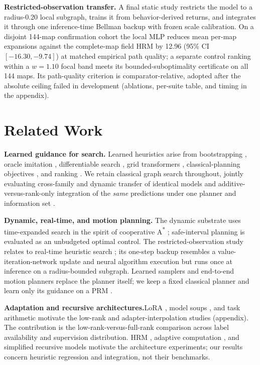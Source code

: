 \documentclass[letterpaper]{article} %
\begin{document}
\textbf{Restricted-observation transfer.} A final static study restricts the model to a radius-0.20 local subgraph, trains it from behavior-derived returns, and integrates it through one inference-time Bellman backup with frozen scale calibration. On a disjoint 144-map confirmation cohort the local MLP reduces mean per-map expansions against the complete-map field HRM by 12.96 (95\% CI $[-16.30,-9.74]$) at matched empirical path quality; a separate control ranking within a $w{=}1.10$ focal band meets its bounded-suboptimality certificate on all 144 maps. Its path-quality criterion is comparator-relative, adopted after the absolute ceiling failed in development (ablations, per-suite table, and timing in the appendix).
\section{Related Work}

\textbf{Learned guidance for search.} Learned heuristics arise from bootstrapping \citep{arfaee2011bootstrap}, oracle imitation \citep{bhardwaj2017sail}, differentiable search \citep{yonetani2021neuralastar}, grid transformers \citep{kirilenko2023transpath}, classical-planning objectives \citep{ferber2020neural}, and ranking \citep{chrestien2023rank}. We retain classical graph search throughout, jointly evaluating cross-family and dynamic transfer of identical models and additive-versus-rank-only integration of the \emph{same} predictions under one planner and information set \citep{pohl1970,pearl1982semiadmissible,aine2016mha}.

\textbf{Dynamic, real-time, and motion planning.} The dynamic substrate uses time-expanded search in the spirit of cooperative A\textsuperscript{*} \citep{silver2005cooperative}; safe-interval planning \citep{phillips2011sipp} is evaluated as an unbudgeted optimal control. The restricted-observation study relates to real-time heuristic search \citep{korf1990rta,koenig2006rtaa}; its one-step backup resembles a value-iteration-network update \citep{tamar2016vin,lee2018gppn} and neural algorithm execution \citep{velickovic2021nar} but runs once at inference on a radius-bounded subgraph. Learned samplers and end-to-end motion planners \citep{ichter2018sampling,qureshi2019mpnet} replace the planner itself; we keep a fixed classical planner and learn only its guidance on a PRM \citep{kavraki1996prm}.

\textbf{Adaptation and recursive architectures.}\hspace{0.25em}LoRA \citep{hu2021lora}, model soups \citep{wortsman2022soups}, and task arithmetic \citep{ilharco2022task} motivate the low-rank and adapter-interpolation studies (appendix). The contribution is the low-rank-versus-full-rank comparison across label availability and supervision distribution. HRM \citep{wang2025hrm}, adaptive computation \citep{graves2016act,banino2021pondernet}, and simplified recursive models \citep{jolicoeur2025trm} motivate the architecture experiments; our results concern heuristic regression and integration, not their benchmarks.
\end{document}
